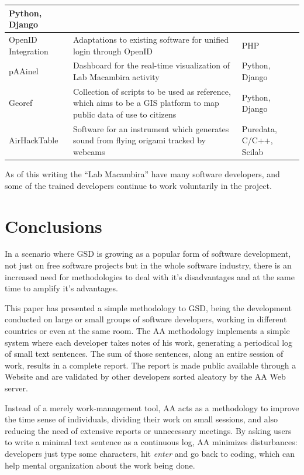 \documentclass[letterpaper]{article}
\begin{document}
\begin{table}
\begin{tabular}{|l|p{5cm}|l|}
        Python, Django \\
        \hline
        OpenID Integration & Adaptations to existing software for
        unified login through OpenID & PHP \\
        \hline
        pAAinel & Dashboard for the real-time visualization of Lab
        Macambira activity & Python, Django \\
        \hline
        Georef & Collection of scripts to be used as reference, which
        aims to be a GIS platform to map public data of use to
        citizens & Python, Django \\
        \hline
        AirHackTable & Software for an instrument which generates
        sound from flying origami tracked by webcams & Puredata,
        C/C++, Scilab \\
        \hline
        \end{tabular}
    \label{tabela:criados}
\end{table}

As of this writing the ``Lab Macambira'' have many software developers, and some
of the trained developers continue to work voluntarily in the project.

\section{Conclusions}
\label{conclusions}

In a scenario where GSD is growing as a popular form of software development,
not just on free software projects but in the whole software industry, there is an increased need for
methodologies to deal with it's disadvantages and at the same time to amplify it's
advantages.

This paper has presented a simple methodology to GSD, being the development conducted
on large or small groups of software developers, working in different countries
or even at the same room. The AA methodology implements a simple system where
each developer takes notes of his work, generating a periodical log of small text
sentences. The sum of those sentences, along an entire session of work, results
in a complete report. The report is made public available through a Website and
are validated by other developers sorted aleatory by the AA Web server.

Instead of a merely work-management tool, AA acts as a methodology to improve the
time sense of individuals, dividing their work on small sessions, and also
reducing the need of extensive reports or unnecessary meetings. By asking users
to write a minimal text sentence as a continuous log, AA minimizes
disturbances: developers just type some
characters, hit \textit{enter} and go back to coding, which can help mental organization about the work being done.
\end{document}

